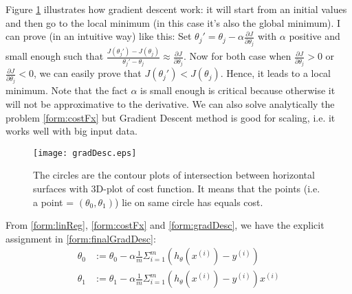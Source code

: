 Figure \ref{fig:gradDesc} illustrates how gradient descent work: it will start from an initial values and then go to the local minimum (in this case it's also the global minimum). I can prove (in an intuitive way) like this: Set $\theta_{j}' = \theta_j - \alpha \frac{\partial J}{\partial \theta_j}$ with $\alpha$ positive and small enough such that $\frac{J(\theta_{j}') - J(\theta_j)}{\theta_{j}' - \theta_j} \approx \frac{\partial J}{\partial \theta_j}$. Now for both case when $\frac{\partial J}{\partial \theta_j} > 0$ or $\frac{\partial J}{\partial \theta_j} < 0$, we can easily prove that $J(\theta_{j}') < J(\theta_j)$. Hence, it leads to a local minimum. Note that the fact $\alpha$ is small enough is critical because otherwise it will not be approximative to the derivative. We can also solve  analytically the problem \eqref{form:costFx} but Gradient Descent method is good for scaling, i.e. it works well with big input data.  
\begin{figure}[!ht]
\centering
\texttt{[image: gradDesc.eps]}
\caption[Gradient Descent Illustration]{The circles are the contour plots of intersection between horizontal surfaces with 3D-plot of cost function. It means that the points (i.e. a point = $(\theta_0, \theta_1)$) lie on same circle has equals cost.}
\label{fig:gradDesc}
\end{figure}

From \eqref{form:linReg}, \eqref{form:costFx} and \eqref{form:gradDesc}, we have the explicit assignment in \eqref{form:finalGradDesc}:
\begin{align}
\label{form:finalGradDesc}
\theta_0 &:= \theta_0 - \alpha \frac{1}{m} \Sigma_{i=1}^{m} (h_{\theta}(x^{(i)}) - y^{(i)}) \nonumber \\
\theta_1 &:= \theta_1 - \alpha \frac{1}{m} \Sigma_{i=1}^{m} (h_{\theta}(x^{(i)}) - y^{(i)})x^{(i)} 
\end{align}
